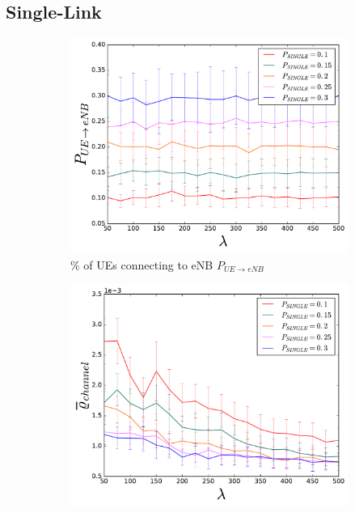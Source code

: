 \subsection{Single-Link}\label{description:SINGLE}
\begin{figure}
  \begin{subfigure}[b]{0.5\linewidth}
    \centering
    \captionsetup{justification=centering}
    \includegraphics[width=1\linewidth]{figures/SINGLELINES_2} 
    \caption{\% of UEs connecting to eNB $P_{UE\rightarrow eNB}$ }
    \label{fig:SINGLELINES_2} 
    \vspace{4ex}
  \end{subfigure}%
  \begin{subfigure}[b]{0.5\linewidth}
    \centering
    \captionsetup{justification=centering}
    \includegraphics[width=1\linewidth]{figures/SINGLELINES_8} 

\end{subfigure}
\end{figure}
